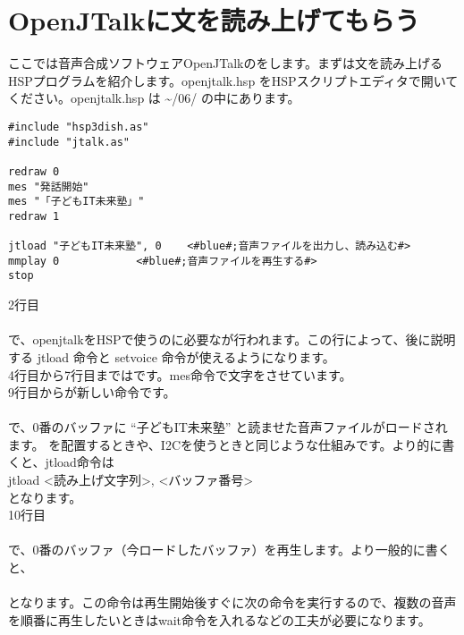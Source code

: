 \newpage
\section{OpenJTalkに文を読み上げてもらう}
ここでは音声合成ソフトウェアOpenJTalkのをします。まずは文を読み上げるHSPプログラムを紹介します。openjtalk.hsp をHSPスクリプトエディタで開いてください。openjtalk.hsp は  \textasciitilde /06/ の中にあります。\\

\begin{lstlisting}[caption=openjtalk.hsp,label=openjtalk.hsp]
#include "hsp3dish.as"
#include "jtalk.as"

redraw 0
mes "発話開始"
mes "「子どもIT未来塾」"
redraw 1

jtload "子どもIT未来塾", 0	<#blue#;音声ファイルを出力し、読み込む#>
mmplay 0			<#blue#;音声ファイルを再生する#>
stop
\end{lstlisting}

\noindent
2行目\\
\\
で、openjtalkをHSPで使うのに必要なが行われます。この行によって、後に説明する jtload 命令と setvoice 命令が使えるようになります。\\
4行目から7行目まではです。mes命令で文字をさせています。\\
9行目からが新しい命令です。\\
\\
で、0番のバッファに “子どもIT未来塾” と読ませた音声ファイルがロードされます。 を配置するときや、I2Cを使うときと同じような仕組みです。より的に書くと、jtload命令は\\
jtload <読み上げ文字列>, <バッファ番号>\\
となります。\\
10行目\\
\\
で、0番のバッファ（今ロードしたバッファ）を再生します。より一般的に書くと、\\
\\
となります。この命令は再生開始後すぐに次の命令を実行するので、複数の音声を順番に再生したいときはwait命令を入れるなどの工夫が必要になります。\\

\begin{tcolorbox}[title=\useOmetoi]
\begin{enumerate}
\end{enumerate}
\end{tcolorbox}
